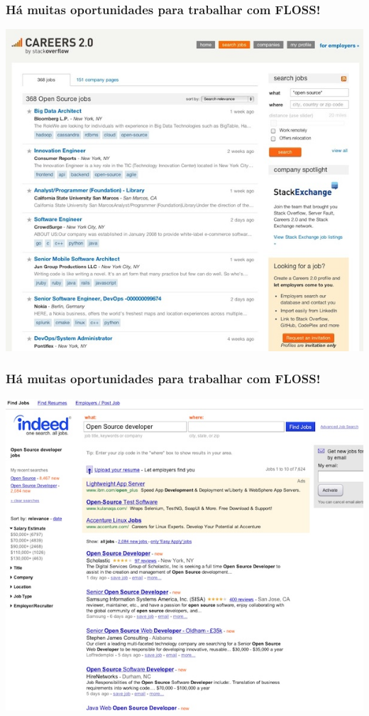 \documentclass[xcolor=dvipsnames]{beamer}
\begin{document}
\begin{frame}
	\frametitle{Há muitas oportunidades para trabalhar com FLOSS!}
 	\includegraphics[scale=0.45]{oss_jobs.jpg}
\end{frame}

\begin{frame}
	\frametitle{Há muitas oportunidades para trabalhar com FLOSS!}
 	\includegraphics[scale=0.45]{oss_jobs2.jpg}
\end{frame}
\end{document}
